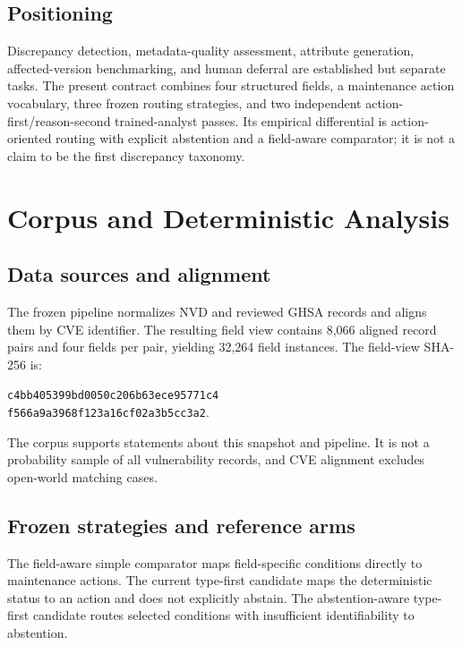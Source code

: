\documentclass[preprint,review,12pt,authoryear]{elsarticle}
\begin{document}
\subsection{Positioning}

Discrepancy detection, metadata-quality assessment, attribute generation,
affected-version benchmarking, and human deferral are established but separate
tasks. The present contract combines four structured fields, a maintenance
action vocabulary, three frozen routing strategies, and two independent
action-first/reason-second trained-analyst passes. Its empirical differential is
action-oriented routing with explicit abstention and a field-aware comparator;
it is not a claim to be the first discrepancy taxonomy.

\section{Corpus and Deterministic Analysis}
\label{sec:corpus}

\subsection{Data sources and alignment}

The frozen pipeline normalizes NVD and reviewed GHSA records and aligns them by
CVE identifier. The resulting field view contains 8,066 aligned record pairs
and four fields per pair, yielding 32,264 field instances. The field-view
SHA-256 is:
\begin{center}
\texttt{c4bb405399bd0050c206b63ece95771c4}\\
\texttt{f566a9a3968f123a16cf02a3b5cc3a2}.
\end{center}
The corpus supports statements about this snapshot and pipeline. It is not a
probability sample of all vulnerability records, and CVE alignment excludes
open-world matching cases.

\subsection{Frozen strategies and reference arms}

The field-aware simple comparator maps field-specific conditions directly to
maintenance actions. The current type-first candidate maps the deterministic
status to an action and does not explicitly abstain. The abstention-aware
type-first candidate routes selected conditions with insufficient
identifiability to abstention.
\end{document}
